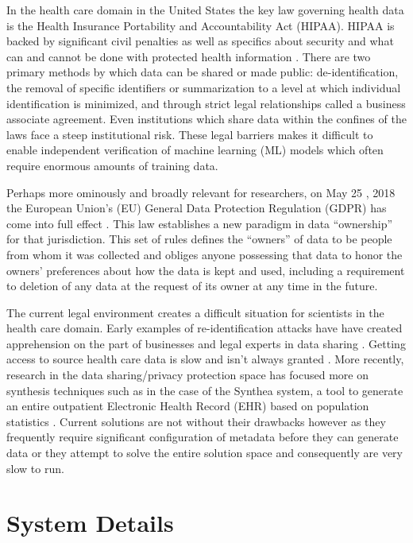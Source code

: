 \documentclass{article}
\begin{document}
In the health care domain in the United States the key law governing health data is the Health Insurance Portability and Accountability Act (HIPAA). HIPAA is backed by significant civil penalties as well as specifics about security and what can and cannot be done with protected health information \cite{hippaviol}. There are two primary methods by which data can be shared or made public: de-identification, the removal of specific identifiers or summarization to a level at which individual identification is minimized, and through strict legal relationships called a business associate agreement. Even institutions which share data within the confines of the laws face a steep institutional risk. These legal barriers makes it difficult to enable independent verification of machine learning (ML) models which often require enormous amounts of training data.

Perhaps more ominously and broadly relevant for researchers, on May 25 , 2018 the European Union's (EU) General Data Protection Regulation (GDPR) has come into full effect \cite{gdpr}. This law establishes a new paradigm in data ``ownership'' for that jurisdiction. This set of rules defines the ``owners'' of data to be people from whom it was collected and obliges anyone possessing that data to honor the owners' preferences about how the data is kept and used, including a requirement to deletion of any data at the request of its owner at any time in the future.

The current legal environment creates a difficult situation for scientists in the health care domain. Early examples of re-identification attacks \cite{sweeney_2002} have have created apprehension on the part of businesses and legal experts in data sharing \cite{ohm_broken_2009}. Getting access to source health care data is slow and isn't always granted \cite{hodge_legal_1999, committee_hipaa_privacy_rule_2009}. More recently, research in the data sharing/privacy protection space has focused more on synthesis techniques such as in the case of the Synthea system, a tool to generate an entire outpatient Electronic Health Record (EHR) based on population statistics \cite{walonoski_synthea_2018}. Current solutions are not without their drawbacks however as they frequently require significant configuration of metadata before they can generate data or they attempt to solve the entire solution space and consequently are very slow to run.

\section{System Details}
\end{document}

